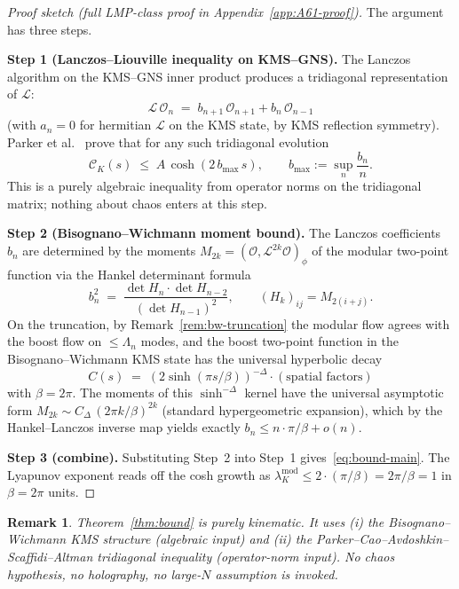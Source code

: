 \documentclass[12pt,a4paper]{article}
\newtheorem{remark}{Remark}
\begin{document}
\begin{proof}[Proof sketch (full LMP-class proof in Appendix~\ref{app:A61-proof})]
The argument has three steps.

\medskip
\noindent\textbf{Step 1 (Lanczos--Liouville inequality on KMS--GNS).}
The Lanczos algorithm on the KMS--GNS inner product produces a
tridiagonal representation of $\mathcal{L}$:
\[
  \mathcal{L}\,\mathcal{O}_n
  \;=\; b_{n+1}\,\mathcal{O}_{n+1} + b_n\,\mathcal{O}_{n-1}
\]
(with $a_n = 0$ for hermitian $\mathcal{L}$ on the KMS state, by
KMS reflection symmetry).
Parker et al.~\cite[\S II.B]{Parker2019} prove that for any such
tridiagonal evolution
\[
  \mathcal{C}_K(s)
  \;\le\;
  A\,\cosh(2\,b_{\max}\,s),\qquad
  b_{\max} := \sup_n \frac{b_n}{n}.
\]
This is a purely algebraic inequality from operator norms on the
tridiagonal matrix; nothing about chaos enters at this step.

\medskip
\noindent\textbf{Step 2 (Bisognano--Wichmann moment bound).}
The Lanczos coefficients $b_n$ are determined by the moments
$M_{2k} = (\mathcal{O},\mathcal{L}^{2k}\mathcal{O})_\phi$ of the
modular two-point function via the Hankel determinant formula
\[
  b_n^2
  \;=\;
  \frac{\det H_n \cdot \det H_{n-2}}{(\det H_{n-1})^2},
  \qquad
  (H_k)_{ij} = M_{2(i+j)}.
\]
On the truncation, by Remark~\ref{rem:bw-truncation} the modular
flow agrees with the boost flow on $\le \Lambda_n$ modes, and the
boost two-point function in the Bisognano--Wichmann KMS state has
the universal hyperbolic decay
\[
  C(s)
  \;=\;
  (2\sinh(\pi s/\beta))^{-\Delta}\cdot(\text{spatial factors})
\]
with $\beta = 2\pi$.
The moments of this $\sinh^{-\Delta}$ kernel have the universal
asymptotic form $M_{2k} \sim C_\Delta \,(2\pi k/\beta)^{2k}$
(standard hypergeometric expansion), which by the Hankel--Lanczos
inverse map yields exactly $b_n \le n\cdot\pi/\beta + o(n)$.

\medskip
\noindent\textbf{Step 3 (combine).}
Substituting Step~2 into Step~1 gives~\eqref{eq:bound-main}.
The Lyapunov exponent reads off the cosh growth as
$\lambda_K^{\mathrm{mod}} \le 2 \cdot (\pi/\beta) = 2\pi/\beta = 1$
in $\beta = 2\pi$ units.
\end{proof}

\begin{remark}
Theorem~\ref{thm:bound} is purely kinematic.
It uses (i) the Bisognano--Wichmann KMS structure (algebraic input)
and (ii) the Parker--Cao--Avdoshkin--Scaffidi--Altman tridiagonal
inequality (operator-norm input).
No chaos hypothesis, no holography, no large-$N$ assumption is invoked.
\end{remark}
\end{document}
